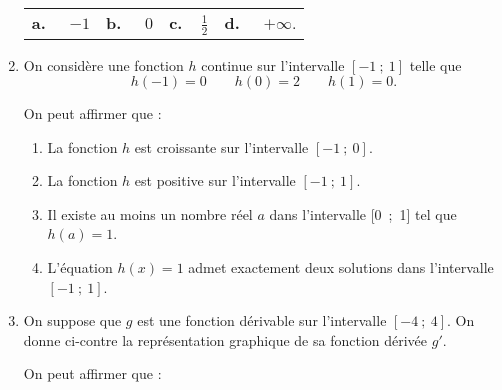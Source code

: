 \begin{enumerate}
\begin{tabularx}{\linewidth}{*{4}{X}}
\textbf{a.~~} $-1 $ &\textbf{b.~~} $0$&\textbf{c.~~}$\frac{1}{2} $& \textbf{d.~~} $+\infty  $.
\end{tabularx}

\item On considère une fonction $h$ continue sur l’intervalle $[-1~;~1]$ telle que
\[h(-1)=0 \qquad  h(0)=2\qquad  h(1)=0 .\]

On peut affirmer que :

\begin{enumerate}
\item La fonction $h$ est croissante sur l’intervalle $[-1~;~0]$.
\item La fonction $h$ est positive sur l’intervalle $[-1~;~1]$.
\item Il existe au moins un nombre réel $a$ dans l’intervalle [0~;~1] tel que $h(a) =1$.
\item L’équation $h(x)=1$ admet exactement deux solutions dans l’intervalle $[-1~;~1]$.
\end{enumerate}

\item On suppose que $g$ est une fonction dérivable sur l’intervalle $[-4~;~4]$.
On donne ci-contre la représentation graphique de sa fonction dérivée $g'$.

On peut affirmer que :


\end{enumerate}
